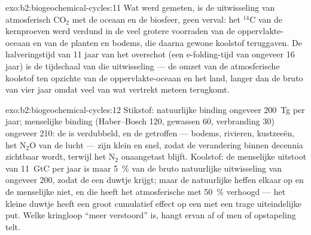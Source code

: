 \begin{solution}{exo:b2:biogeochemical-cycles:11}
Wat werd gemeten, is de uitwisseling van atmosferisch $\mathrm{CO_2}$ met de
oceaan en de biosfeer, geen verval: het $\mathrm{{}^{14}C}$ van de kernproeven
werd verdund in de veel grotere voorraden van de oppervlakte-oceaan en van de
planten en bodems, die daarna gewone koolstof teruggaven. De halveringstijd van
11 jaar van het overschot (een e-folding-tijd van ongeveer 16 jaar) is de
tijdschaal van die uitwisseling --- de omzet van de atmosferische koolstof ten
opzichte van de oppervlakte-oceaan en het land, langer dan de bruto
 van vier jaar omdat veel van wat vertrekt meteen terugkomt.
\end{solution}

\begin{solution}{exo:b2:biogeochemical-cycles:12}
Stikstof: natuurlijke binding ongeveer 200~Tg per jaar; menselijke binding
(Haber--Bosch 120, gewassen 60, verbranding 30) ongeveer 210: de  is
verdubbeld, en de getroffen  --- bodems, rivieren, kustzeeën, het
$\mathrm{N_2O}$ van de lucht --- zijn klein en snel, zodat de verandering
binnen decennia zichtbaar wordt, terwijl het  $\mathrm{N_2}$ onaangetast
blijft. Koolstof: de menselijke uitstoot van 11~GtC per jaar is maar \qty{5}{\%} van
de bruto natuurlijke uitwisseling van ongeveer 200, zodat de  een duwtje
krijgt; maar de natuurlijke  heffen elkaar op en de menselijke niet, en die
heeft het atmosferische  met \qty{50}{\%} verhoogd --- het kleine
duwtje heeft een groot cumulatief effect op een  met een trage
uiteindelijke put. Welke kringloop ``meer verstoord'' is, hangt ervan af of
men  of opstapeling telt.
\end{solution}

